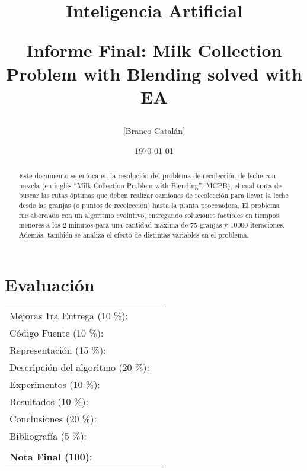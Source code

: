 \documentclass[letter, 10pt]{article}
\begin{document}
\title{Inteligencia Artificial \\ \begin{Large}Informe Final: Milk Collection Problem with Blending solved with EA\end{Large}}
\author{[Branco Catalán]}
\date{\today}
\maketitle


\section*{Evaluaci\'on}

\begin{tabular}{ll}
Mejoras 1ra Entrega (10 \%): &  \underline{\hspace{2cm}}\\
C\'odigo Fuente (10 \%): &  \underline{\hspace{2cm}}\\
Representaci\'on (15 \%):  & \underline{\hspace{2cm}} \\
Descripci\'on del algoritmo (20 \%):  & \underline{\hspace{2cm}} \\
Experimentos (10 \%):  & \underline{\hspace{2cm}} \\
Resultados (10 \%):  & \underline{\hspace{2cm}} \\
Conclusiones (20 \%): &  \underline{\hspace{2cm}}\\
Bibliograf\'ia (5 \%): & \underline{\hspace{2cm}}\\
 &  \\
\textbf{Nota Final (100)}:   & \underline{\hspace{2cm}}
\end{tabular}

\begin{abstract}
Este documento se enfoca en la resolución del problema de recolecci\'on de leche con mezcla (en ingl\'es ``Milk Collection Problem with Blending'', MCPB), el cual trata de buscar las rutas \'optimas que deben realizar camiones de recolecci\'on para llevar la leche desde las granjas (o puntos de recolecci\'on) hasta la planta procesadora. El problema fue abordado con un algoritmo evolutivo, entregando soluciones factibles en tiempos menores a los 2 minutos para una cantidad máxima de 75 granjas y 10000 iteraciones. Además, también se analiza el efecto de distintas variables en el problema.

\end{abstract}
\end{document}
